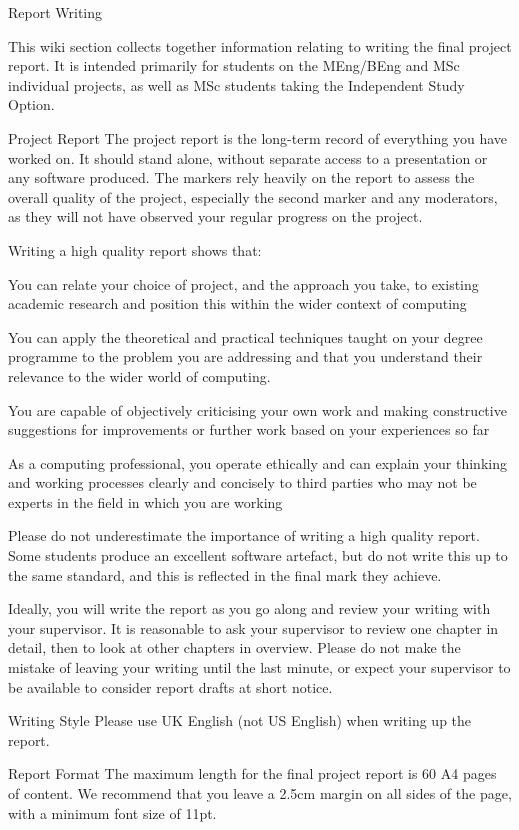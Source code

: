 Report Writing

This wiki section collects together information relating to writing the final project report. It is intended primarily for students on the MEng/BEng and MSc individual projects, as well as MSc students taking the Independent Study Option.

Project Report
The project report is the long-term record of everything you have worked on. It should stand alone, without separate access to a presentation or any software produced. The markers rely heavily on the report to assess the overall quality of the project, especially the second marker and any moderators, as they will not have observed your regular progress on the project.

Writing a high quality report shows that:

You can relate your choice of project, and the approach you take, to existing academic research and position this within the wider context of computing

You can apply the theoretical and practical techniques taught on your degree programme to the problem you are addressing and that you understand their relevance to the wider world of computing.

You are capable of objectively criticising your own work and making constructive suggestions for improvements or further work based on your experiences so far

As a computing professional, you operate ethically and can explain your thinking and working processes clearly and concisely to third parties who may not be experts in the field in which you are working

Please do not underestimate the importance of writing a high quality report. Some students produce an excellent software artefact, but do not write this up to the same standard, and this is reflected in the final mark they achieve.

Ideally, you will write the report as you go along and review your writing with your supervisor. It is reasonable to ask your supervisor to review one chapter in detail, then to look at other chapters in overview. Please do not make the mistake of leaving your writing until the last minute, or expect your supervisor to be available to consider report drafts at short notice.

Writing Style
Please use UK English (not US English) when writing up the report.

Report Format
The maximum length for the final project report is 60 A4 pages of content. We recommend that you leave a 2.5cm margin on all sides of the page, with a minimum font size of 11pt.

